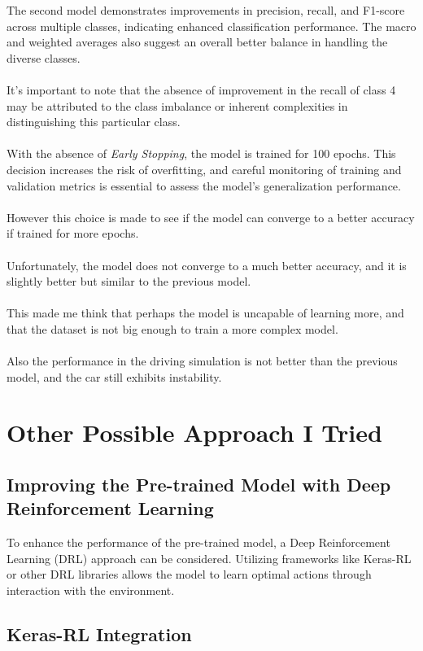 \documentclass{article}
\begin{document}
The second model demonstrates improvements in precision, recall, and F1-score across multiple classes, indicating enhanced classification performance. The macro and weighted averages also suggest an overall better balance in handling the diverse classes.
\\
\\
It's important to note that the absence of improvement in the recall of class 4 may be attributed to the class imbalance or inherent complexities in distinguishing this particular class.
\\
\\
With the absence of \emph{Early Stopping}, the model is trained for 100 epochs. This decision increases the risk of overfitting, and careful monitoring of training and validation metrics is essential to assess the model's generalization performance.
\\
\\
However this choice is made to see if the model can converge to a better accuracy if trained for more epochs.
\\
\\
Unfortunately, the model does not converge to a much better accuracy, and it is slightly better but similar to the previous model.
\\
\\
This made me think that perhaps the model is uncapable of learning more, and that the dataset is not big enough to train a more complex model.
\\
\\
Also the performance in the driving simulation is not better than the previous model, and the car still exhibits instability.

\section{Other Possible Approach I Tried}

\subsection{Improving the Pre-trained Model with Deep Reinforcement Learning}

To enhance the performance of the pre-trained model, a Deep Reinforcement Learning (DRL) approach can be considered. Utilizing frameworks like Keras-RL or other DRL libraries allows the model to learn optimal actions through interaction with the environment.

\subsection{Keras-RL Integration}
\end{document}
